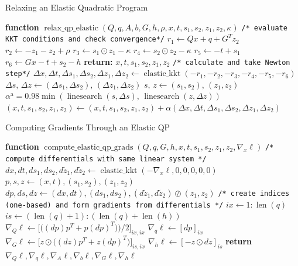 \begin{algorithm}
\caption{Relaxing an Elastic Quadratic Program}\label{qpax:alg:relax_elastic_qp}
\begin{algorithmic}[1]
\State \textbf{function} $\operatorname{relax\_qp\_elastic}(Q,q,A, b, G,h, \rho, x, t, s_1, s_2, z_1, z_2, \kappa)$ %
\State \texttt{/* evaluate KKT conditions and check convergence*/}
\State $r_1 \gets Qx + q  + G^Tz_2$ %
\State $r_2 \gets -z_1 - z_2 + \rho$
\State $r_3 \gets s_1 \odot z_1 - \kappa$ 
\State $r_4 \gets s_2 \odot z_2 - \kappa$ 
\State $r_5 \gets -t + s_1 $
\State $r_6 \gets Gx - t + s_2 - h$
\State \textbf{return:} $x, t, s_1, s_2, z_1, z_2$
\EndIf
\State
\State \texttt{/* calculate and take Newton step*/}
\State $\Delta x, \Delta t, \Delta s_1, \Delta s_2, \Delta z_1, \Delta z_2\gets \operatorname{elastic\_kkt}(-r_1, -r_2, -r_3, -r_4, -r_5, -r_6)$
\State $\Delta s,\, \Delta z\gets (\Delta s_1, \Delta s_2), \,(\Delta z_1, \Delta z_2)$
\State $s,\, z \gets (s_1,s_2), \, (z_1, z_2)$
\State $\alpha^\text{a} = 0.98 \min( \operatorname{linesearch}(s, \Delta s),\, \operatorname{linesearch}(z, \Delta z) )$ \Comment{\eqref{qpax:sec:background:linesearch}}
\State $(x, t, s_1, s_2, z_1, z_2) \gets (x, t, s_1, s_2, z_1, z_2)  + \alpha(\Delta x, \Delta t, \Delta s_1, \Delta s_2,  \Delta z_1, \Delta z_2)$
\EndFor
\end{algorithmic}
\end{algorithm}
%
\begin{algorithm}
\begin{algorithmic}[1]
    \caption{Computing Gradients Through an Elastic QP}\label{qpax:alg:opt_net_elastic}
        \State \textbf{function} $\operatorname{compute\_elastic\_qp\_grads}(Q, q, G, h, x, t,s_1,s_2,z_1,z_2,\nabla_x \ell)$ %
        \State \texttt{/* compute differentials with same linear system */}
        \State $dx, dt, ds_1, ds_2, d\tilde{z}_1, d\tilde{z}_2 \gets \operatorname{elastic\_kkt}(-\nabla_x \ell, 0, 0, 0, 0, 0)$
        \State $p, s, z \gets (x, t), (s_1, s_2), (z_1, z_2)$
        \State $dp, ds, dz \gets (dx, dt), (ds_1, ds_2), (d\tilde{z}_1, d\tilde{z}_2) \oslash (z_1, z_2)$
        \State \texttt{/* create indices (one-based) and form gradients from differentials */}
        \State $ix \gets 1:\operatorname{len}(q)$
        \State $is \gets (\operatorname{len}(q) + 1):(\operatorname{len}(q) + \operatorname{len}(h))$
        \State $\nabla_Q \ell \gets \big[ \big((dp) p^T + p (dp)^T)\big)/2 \big]_{ix,ix}$
        \State $\nabla_q \ell \gets [dp]_{ix}$
        \State $\nabla_G \ell \gets \big[ z \odot \big((dz)p^T + z(dp)^T\big) \big]_{is, ix}$
        \State $\nabla_h \ell \gets [-z \odot dz]_{is}$
    \State \textbf{return} $\nabla_Q \ell, \nabla_q \ell, \nabla_A \ell, \nabla_b \ell, \nabla_G \ell, \nabla_h \ell$
\end{algorithmic}
\end{algorithm}
